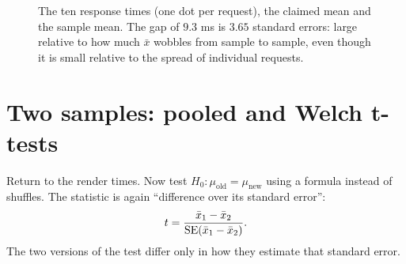 \begin{figure}[H]
\centering
{}
\caption{The ten response times (one dot per request), the claimed mean and the
sample mean. The gap of
$9.3$ ms is $3.65$ standard errors: large relative to how much $\bar x$ wobbles from
sample to sample, even though it is small relative to the spread of individual
requests.}
\label{fig:ht-onesample}
\end{figure}

\section{Two samples: pooled and Welch t-tests}
\label{sec:ht-t2}

Return to the render times. Now test $H_0\colon \mu_{\text{old}} = \mu_{\text{new}}$
using a formula instead of shuffles. The statistic is again
``difference over its standard error'':
\[
  t = \frac{\bar x_1 - \bar x_2}{\operatorname{SE}(\bar x_1 - \bar x_2)} .
\]
The two versions of the test differ only in how they estimate that standard error.

